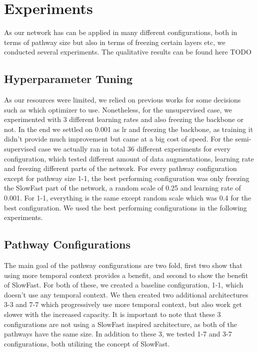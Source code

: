 \section{Experiments}
As our network has can be applied in many different configurations, both in terms of pathway size but also in terms of freezing certain layers etc, we conducted several experiments. The qualitative results can be found here TODO

\subsection{Hyperparameter Tuning}
As our resources were limited, we relied on previous works for some decisions such as which optimizer to use. Nonetheless, for the unsupervised case, we experimented with 3 different learning rates and also freezing the backbone or not. In the end we settled on 0.001 as lr and freezing the backbone, as training it didn't provide much improvement but came at a big cost of speed. For the semi-supervised case we actually ran in total 36 different experiments for every configuration, which tested different amount of data augmentations, learning rate and freezing different parts of the network. For every pathway configuration except for pathway size 1-1, the best performing configuration was only freezing the SlowFast part of the network, a random scale of 0.25 and learning rate of 0.001. For 1-1, everything is the same except random scale which was 0.4 for the best configuration. We used the best performing configurations in the following experiments.

\subsection{Pathway Configurations}
The main goal of the pathway configurations are two fold, first two show that using more temporal context provides a benefit, and second to show the benefit of SlowFast. 
For both of these, we created a baseline configuration, 1-1, which doesn't use any temporal context. We then created two additional architectures 3-3 and 7-7 which progressively use more temporal context, but also work get slower with the increased capacity. It is important to note that these 3 configurations are not using a SlowFast inspired architecture, as both of the pathways have the same size. In addition to these 3, we tested 1-7 and 3-7 configurations, both utilizing the concept of SlowFast.

